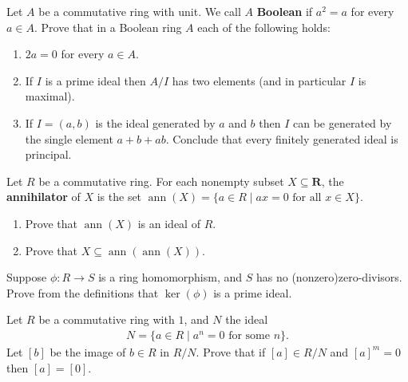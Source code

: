 \documentclass[11pt,twoside,openany]{memoir}
\begin{document}
    \newpage
    \begin{exercise}
    Let $A$ be a commutative ring with unit. We call $A$ \textbf{Boolean} if $a^2=a$ for every $a\in A$. Prove that in a Boolean ring $A$ each of the following holds:
    \begin{enumerate}[label = (\arabic*)]
        \item $2a=0$ for every $a\in A$.
        \item If $I$ is a prime ideal then $A/I$ has two elements (and in particular $I$ is maximal).
        \item If $I=(a,b)$ is the ideal generated by $a$ and $b$ then $I$ can be generated by the single element $a + b + ab$. Conclude that every finitely generated ideal is principal.
    \end{enumerate}
    \end{exercise}
    
    \begin{exercise}
    Let $R$ be a commutative ring. For each nonempty subset $X \subseteq \mathbf{R}$, the \textbf{annihilator} of $X$ is the set $\operatorname{ann}(X) = \{a \in R \mid ax = 0 \text{ for all }x \in X\}$.
    \begin{enumerate}[label = (\arabic*)]
        \item Prove that $\operatorname{ann}(X)$ is an ideal of $R$.
        \item Prove that $X\subseteq \operatorname{ann}(\operatorname{ann}(X))$.
    \end{enumerate}
    \end{exercise}
    
    \begin{exercise}
    Suppose $\phi:R\to S$ is a ring homomorphism, and $S$ has no (nonzero)zero-divisors. Prove from the definitions that $\ker(\phi)$ is a prime ideal.
    \end{exercise}
    
    \begin{exercise}
    Let $R$ be a commutative ring with $1$, and $N$ the ideal 
        \begin{equation*}
        \begin{split}
            N=\{a\in R\mid a^n=0 \text{ for some }n\}.
        \end{split}
        \end{equation*}
    Let $[b]$ be the image of $b\in R$ in $R/N$. Prove that if $[a] \in R/N$ and $[a]^m = 0$ then $[a] = [0]$.
    \end{exercise}
    
\end{document}
